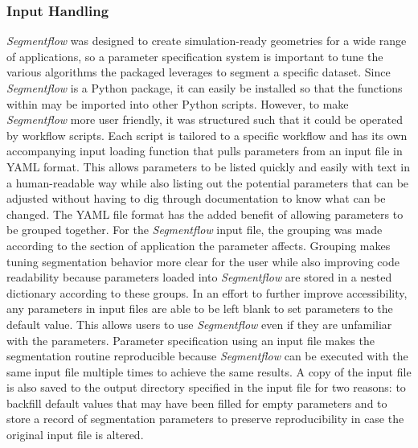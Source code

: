 \subsubsection{Input Handling}
\textit{Segmentflow} was designed to create simulation-ready geometries for
a wide range of applications, so a parameter specification system is
important to tune the various algorithms the packaged leverages to segment
a specific dataset. Since \textit{Segmentflow} is a Python package, it can
easily be installed so that the functions within may be imported into other
Python scripts. However, to make \textit{Segmentflow} more user friendly,
it was structured such that it could be operated by workflow scripts. Each
script is tailored to a specific workflow and has its own accompanying input
loading function that pulls parameters from an input file in YAML format.
This allows parameters to be
listed quickly and easily with text in a human-readable way while also
listing out the potential parameters that can be adjusted without having
to dig through documentation to know what can be changed. The YAML file
format has the added benefit of allowing parameters to be grouped together.
For the \textit{Segmentflow} input file, the grouping was made according
to the section of application the parameter affects.
Grouping makes tuning segmentation behavior more clear for the user
while also improving code readability because parameters loaded into
\textit{Segmentflow} are stored in
a nested dictionary according to these groups. In an effort to further improve
accessibility, any parameters in input files are able to be left
blank to set parameters to the default value.
This allows users to use \textit{Segmentflow} even if
they are unfamiliar with the parameters. Parameter specification using an input
file makes the segmentation routine reproducible because \textit{Segmentflow}
can be executed with the same input file multiple times to achieve the same
results. A copy of the input file is
also saved to the output directory specified in the input file for two
reasons: to backfill
default values that may have been filled for empty parameters and to store
a record of segmentation parameters to preserve
reproducibility in case the original input file is altered.


